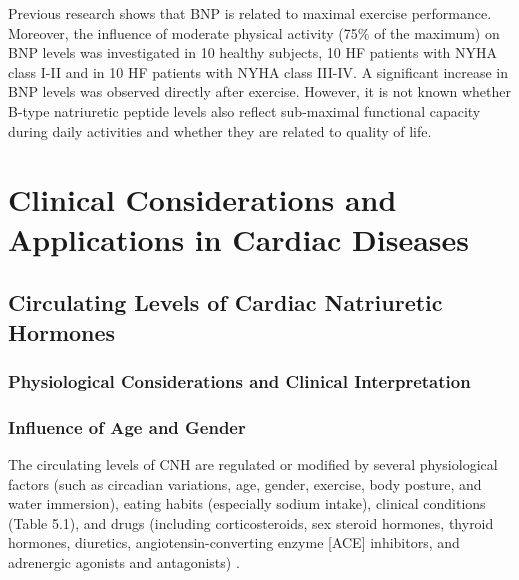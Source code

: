\documentclass[14pt,a4paper,onecolumn]{extarticle}
\begin{document}
Previous research shows that BNP is related to maximal exercise performance. \citep{Kruger2002} Moreover, the influence of moderate physical activity (75\% of the maximum) on BNP levels was investigated in 10 healthy subjects, 10 HF patients with NYHA class I-II and in 10 HF patients with NYHA class III-IV. A significant increase in BNP levels was observed directly after exercise. \citep{McNairy2002} However, it is not known whether B-type natriuretic peptide levels also reflect sub-maximal functional capacity during daily activities and whether they are related to quality of life.


%


\section{Clinical Considerations and Applications in Cardiac Diseases}
\subsection{ Circulating Levels of Cardiac Natriuretic Hormones}
\subsubsection{Physiological Considerations and Clinical Interpretation}
\subsubsection{ Influence of Age and Gender}
The circulating levels of CNH are regulated or modified by several physiological factors
(such as circadian variations, age, gender, exercise, body posture, and water immersion),
eating habits (especially sodium intake), clinical conditions (Table 5.1), and drugs (including corticosteroids, sex steroid hormones, thyroid hormones, diuretics, angiotensin-converting enzyme [ACE] inhibitors, and adrenergic agonists and antagonists) \citep{bib31} \citep{bib32} \citep{bib33} \citep{bib34} \citep{bib35} \citep{bib36}.
\end{document}
